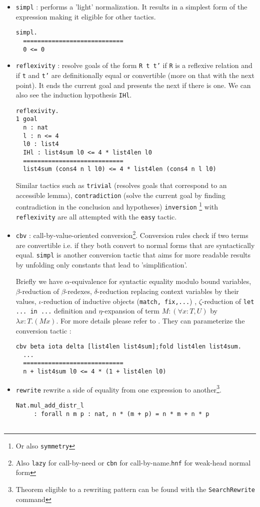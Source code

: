 \documentclass{article}
\begin{document}
\begin{itemize}
            \item \texttt{simpl} : performs a 'light' normalization. It results in a simplest form of the expression making it eligible for other tactics.
            \begin{verbatim}simpl.
  ============================
  0 <= 0\end{verbatim}
            \item \texttt{reflexivity} : resolve goals of the form \texttt{R t t'} if \texttt{R} is a reflexive relation and if \texttt{t} and \texttt{t'} are definitionally equal or convertible
            (more on that with the next point). It ends the current goal and presents the next if there is one. We can also see the induction hypothesis \texttt{IHl}.
            \begin{verbatim}reflexivity.
1 goal
  n : nat
  l : n <= 4
  l0 : list4
  IHl : list4sum l0 <= 4 * list4len l0
  ============================
  list4sum (cons4 n l l0) <= 4 * list4len (cons4 n l l0)\end{verbatim}
             Similar tactics such as \texttt{trivial} (resolves goals that correspond to an accessible lemma), \texttt{contradiction} (solve the current goal by finding contradiction in the conclusion and hypotheses) \texttt{inversion} \footnote{Or also \texttt{symmetry}} with \texttt{reflexivity} are all attempted with the \texttt{easy} tactic.

            \item \texttt{cbv} : call-by-value-oriented conversion\footnote{Also \texttt{lazy} for call-by-need or \texttt{cbn} for call-by-name.\texttt{hnf} for weak-head normal form}. Conversion rules check if two terms are convertible i.e. if they both convert to normal forms that are syntactically equal. \texttt{simpl} is another conversion tactic that aims for more readable results by unfolding only constants that lead to 'simplification'.
            \par Briefly we have $\alpha$-equivalence for syntactic equality modulo bound variables, $\beta$-reduction of $\beta$-redexes, $\delta$-reduction replacing context variables by their values, $\iota$-reduction of inductive objects (\texttt{match, fix,...}) , $\zeta$-reduction of \texttt{let ... in ...} definition and $\eta$-expansion of term $M : (\forall x : T,U)$ by $\lambda x : T.(M x)$. For more details please refer to \cite{Coq}. They can parameterize the conversion tactic :
            \begin{verbatim}cbv beta iota delta [list4len list4sum];fold list4len list4sum.
  ...
  ============================
  n + list4sum l0 <= 4 * (1 + list4len l0)\end{verbatim}
            \item \texttt{rewrite} rewrite a side of equality from one expression to another\footnote{Theorem eligible to a rewriting pattern can be found with the \texttt{SearchRewrite} command}.
            \begin{verbatim}Nat.mul_add_distr_l 
     : forall n m p : nat, n * (m + p) = n * m + n * p 
     

\end{verbatim}
\end{itemize}
\end{document}
